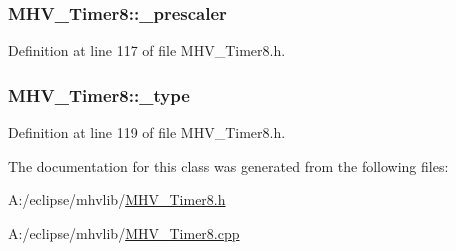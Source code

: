 \hypertarget{class_m_h_v___timer8_a2d610b4bbd5aef2db6a4062dbd063aba}{
\subsubsection[{\-\_\-prescaler}]{ {\bf \-M\-H\-V\-\_\-\-Timer8\-::\-\_\-prescaler}}}
\label{class_m_h_v___timer8_a2d610b4bbd5aef2db6a4062dbd063aba}


\-Definition at line 117 of file \-M\-H\-V\-\_\-\-Timer8.\-h.

\hypertarget{class_m_h_v___timer8_a10c0fdfbbe901b923ea7fb1c0fc9690c}{
\subsubsection[{\-\_\-type}]{ {\bf \-M\-H\-V\-\_\-\-Timer8\-::\-\_\-type}}}
\label{class_m_h_v___timer8_a10c0fdfbbe901b923ea7fb1c0fc9690c}


\-Definition at line 119 of file \-M\-H\-V\-\_\-\-Timer8.\-h.



\-The documentation for this class was generated from the following files\-:\begin{DoxyCompactItemize}
\item 
\-A\-:/eclipse/mhvlib/\hyperlink{_m_h_v___timer8_8h}{\-M\-H\-V\-\_\-\-Timer8.\-h}\item 
\-A\-:/eclipse/mhvlib/\hyperlink{_m_h_v___timer8_8cpp}{\-M\-H\-V\-\_\-\-Timer8.\-cpp}\end{DoxyCompactItemize}
